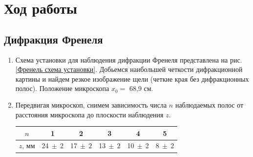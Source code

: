 \documentclass[a4paper, 12pt]{article}
\begin{document}
\section{Ход работы}
\subsection{Дифракция Френеля}

\begin{enumerate}
	\item Схема установки для наблюдения дифракции Френеля представлена на рис. \ref{Френель схема установки}. Добьемся наибольшей четкости дифракционной картины и найдем резкое изображение щели (четкие края без дифракционных полос). Положение микроскопа $x_0 = $ 68,9 см.

	\item Передвигая микроскоп, снимем зависимость числа $n$ наблюдаемых полос от расстояния микроскопа до плоскости наблюдения $z$.
	\begin{center}
		\begin{tabular}{|c|c|c|c|c|c|}
			\hline
			$n$ & 1    & 2    & 3    & 4    & 5    \\ \hline
			$z$, мм & 24$~\pm~$2& 17$~\pm~2$ & 13$~\pm~2$ & 10$~\pm~$2 & 8$~\pm~$2 \\ \hline
		\end{tabular}
	\end{center}


\end{enumerate}
\end{document}
